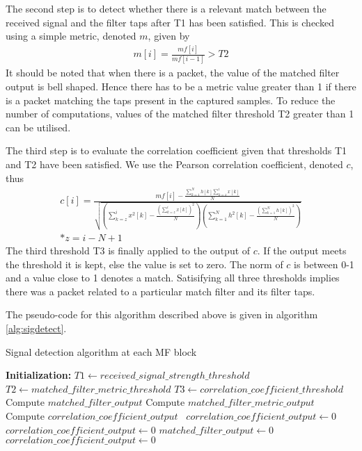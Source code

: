 \documentclass[journal]{IEEEtran}
\begin{document}
The second step is to detect whether there is a relevant match between the received signal and the filter taps after T1 has been satisfied. This is checked using a simple metric, denoted $m$, given by
\begin{align}
{m[i]} = \frac{mf[i]}{mf[i-1]} > {T2} \label{eq:mf2}
\end{align}
It should be noted that when there is a packet, the value of the matched filter output is bell shaped. Hence there has to be a metric value greater than 1 if there is a packet matching the taps present in the captured samples. To reduce the number of computations, values of the matched filter threshold T2 greater than 1 can be utilised.

The third step is to evaluate the correlation coefficient given that thresholds T1 and T2 have been satisfied. We use the Pearson correlation coefficient, denoted $c$, thus
\begin{align}
{c[i]} = \frac{mf[i] - \frac{\displaystyle\sum\limits_{k=1}^N h[k] \displaystyle\sum\limits_{k=z}^i x[k]}{N}}{\sqrt{(\displaystyle\sum\limits_{k=z}^i x^2[k]-\frac{(\displaystyle\sum\limits_{k=z}^i x[k])^2}{N})(\displaystyle\sum\limits_{k=1}^N h^2[k]-\frac{(\displaystyle\sum\limits_{k=1}^N h[k])^2}{N})}} \label{eq:mf3}
\\*{z} = {i-N+1}
\end{align}
The third threshold T3 is finally applied to the output of $c$. If the output meets the threshold it is kept, else the value is set to zero. The norm of $c$ is between 0-1 and a value close to 1 denotes a match. Satisifying all three thresholds implies there was a packet related to a particular match filter and its filter taps.

The pseudo-code for this algorithm described above is given in algorithm \ref{alg:sigdetect}.

\begin{algorithm}
\caption{Signal detection algorithm at each MF block}
\label{alg:sigdetect}

\begin{algorithmic}
\STATE \textbf {Initialization:}
\STATE $T1 \leftarrow received\_signal\_strength\_threshold$
\STATE $T2 \leftarrow matched\_filter\_metric\_threshold$
\STATE $T3 \leftarrow correlation\_coefficient\_threshold$
        \STATE Compute $matched\_filter\_output$
        \STATE Compute $matched\_filter\_metric\_output$
                \STATE Compute $correlation\_coefficient\_output$\
                \STATE $correlation\_coefficient\_output \leftarrow 0$
                \ENDIF
        \ELSE
                \STATE  $correlation\_coefficient\_output \leftarrow 0$
        \ENDIF
\ELSE
        \STATE $matched\_filter\_output \leftarrow 0$
        \STATE $correlation\_coefficient\_output \leftarrow 0$
\ENDIF 
\ENDWHILE


\end{algorithmic}
\end{algorithm}
\end{document}
